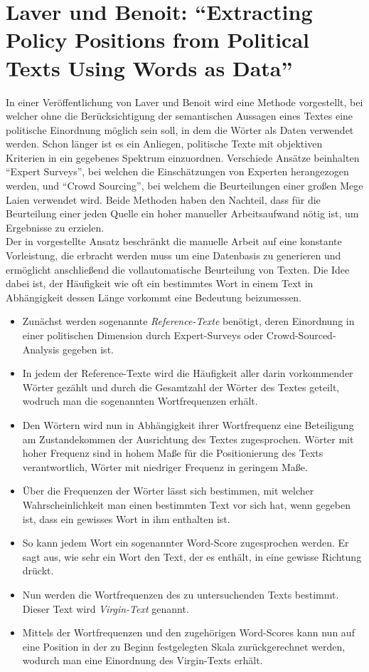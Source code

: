 
\section{Laver und Benoit: \enquote{Extracting Policy Positions from Political Texts Using Words as Data}  }
In einer Veröffentlichung von Laver und Benoit \cite{LuB} wird eine Methode vorgestellt, bei welcher ohne die Berücksichtigung der semantischen Aussagen eines Textes eine politische Einordnung möglich sein soll, in dem die Wörter als Daten verwendet werden. 
Schon länger ist es ein Anliegen, politische Texte mit objektiven Kriterien in ein gegebenes Spektrum einzuordnen. Verschiede Ansätze beinhalten \enquote{Expert Surveys}, bei welchen die Einschätzungen von Experten herangezogen werden, und \enquote{Crowd Sourcing}, bei welchem die Beurteilungen einer großen Mege Laien verwendet wird. Beide Methoden haben den Nachteil, dass für die Beurteilung einer jeden Quelle ein hoher manueller Arbeitsaufwand nötig ist, um Ergebnisse zu erzielen. \\
Der in  \cite{LuB} vorgestellte Ansatz beschränkt die manuelle Arbeit auf eine konstante Vorleistung, die erbracht werden muss um eine Datenbasis zu generieren und ermöglicht anschließend die vollautomatische Beurteilung von Texten. Die Idee dabei ist, der Häufigkeit wie oft ein bestimmtes Wort in einem Text in Abhängigkeit dessen Länge vorkommt eine Bedeutung beizumessen. 
\begin{itemize}
\item Zunächst werden sogenannte \emph{Reference-Texte} benötigt, deren Einordnung in einer politischen Dimension durch Expert-Surveys oder Crowd-Sourced-Analysis gegeben ist.
\item In jedem der Reference-Texte wird die Häufigkeit aller darin vorkommender Wörter gezählt und durch die Gesamtzahl der Wörter des Textes geteilt, wodruch man die sogenannten Wortfrequenzen erhält.
\item Den Wörtern wird nun in Abhängigkeit ihrer Wortfrequenz eine Beteiligung am Zustandekommen der Ausrichtung des Textes zugesprochen. Wörter mit hoher Frequenz sind in hohem Maße für die Positionierung des Texts verantwortlich, Wörter mit niedriger Frequenz in geringem Maße.
\item Über die Frequenzen der Wörter lässt sich bestimmen, mit welcher Wahrscheinlichkeit man einen bestimmten Text vor sich hat, wenn gegeben ist, dass ein gewisses Wort in ihm enthalten ist.
\item So kann jedem Wort ein sogenannter Word-Score zugesprochen werden. Er sagt aus, wie sehr ein Wort den Text, der es enthält, in eine gewisse Richtung drückt.
\item Nun werden die Wortfrequenzen des zu untersuchenden Texts bestimmt. Dieser Text wird \emph{Virgin-Text} genannt.
\item Mittels der Wortfrequenzen und den zugehörigen Word-Scores kann nun auf eine Position in der zu Beginn festgelegten Skala zurückgerechnet werden, wodurch man eine Einordnung des Virgin-Texts erhält.  
\end{itemize}


